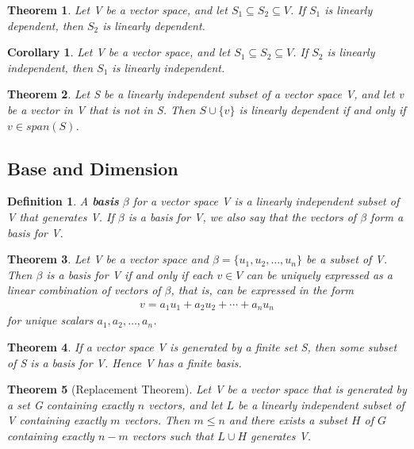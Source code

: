 \documentclass{article}
\newcommand{\bd}[1]{\textbf{#1}}
\theoremstyle{plain}
\newtheorem{theorem}{Theorem}[section]
\newtheorem*{corollary}{Corollary}
\newtheorem*{definition1}{Definition}
\theoremstyle{plain} %
\begin{document}
\begin{theorem}
Let V be a vector space, and let $S_1 \subseteq S_2 \subseteq V$. If $S_1$ is linearly dependent, then $S_2$ is linearly dependent.
\end{theorem}

\begin{corollary}
Let V be a vector space, and let $S_1 \subseteq S_2 \subseteq V$. If $S_2$ is linearly independent, then $S_1$ is linearly independent.
\end{corollary}

\begin{theorem}
Let S be a linearly independent subset of a vector space V, and let v be a vector in V that is not in S. Then $S \cup \{v\}$ is linearly dependent if and only if $v \in span(S)$.
\end{theorem}

\subsection{Base and Dimension}

\begin{definition1}
A \bd{basis} $\beta$ for a vector space V is a linearly independent subset of V that generates V. If $\beta$ is a basis for V, we also say that the vectors of $\beta$ form a basis for V.
\end{definition1}

\begin{theorem}
Let V be a vector space and $\beta = \{u_1, u_2,\ldots,u_n\}$ be a subset of V. Then $\beta$ is a basis for V if and only if each $v \in V$ can be uniquely expressed as a linear combination of vectors of $\beta$, that is, can be expressed in
the form
\begin{align*}
v = a_1u_1 + a_2u_2 + \cdots + a_nu_n
\end{align*}
for unique scalars $a_1, a_2,\ldots,a_n$.
\end{theorem}

\begin{theorem}
If a vector space V is generated by a finite set S, then some subset of S is a basis for V. Hence V has a finite basis.
\end{theorem}

\begin{theorem}[Replacement Theorem] 
Let V be a vector space that is generated by a set G containing exactly $n$ vectors, and let $L$ be a linearly independent subset of V containing exactly $m$ vectors. Then $m \leq n$ and there exists a subset $H$ of $G$ containing exactly $n - m$ vectors such that $L \cup H$ generates V.
\end{theorem}
\end{document}
